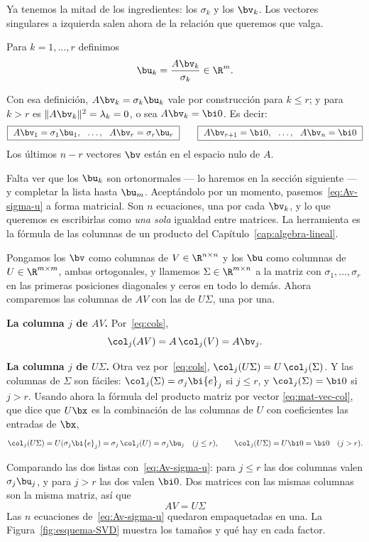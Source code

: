 Ya tenemos la mitad de los ingredientes: los $\sigma_k$ y los $\bv_k$. Los
vectores singulares a izquierda salen ahora de la relación que queremos que
valga.

\begin{definition}\label{def:u}
Para $k=1,\dots,r$ definimos
\[
\bu_k=\frac{A\bv_k}{\sigma_k}\in\R^m .
\]
\end{definition}

Con esa definición, $A\bv_k=\sigma_k\bu_k$ vale por construcción para
$k\le r$; y para $k>r$ es $\|A\bv_k\|^2=\lambda_k=0$, o sea $A\bv_k=\bi 0$.
Es decir:
\begin{equation}\label{eq:Av-sigma-u}
\boxed{\ A\bv_1=\sigma_1\bu_1,\ \ \dots,\ \ A\bv_r=\sigma_r\bu_r\ }
\qquad
\boxed{\ A\bv_{r+1}=\bi 0,\ \ \dots,\ \ A\bv_n=\bi 0\ }
\end{equation}
Los últimos $n-r$ vectores $\bv$ están en el espacio nulo de $A$.

Falta ver que los $\bu_k$ son ortonormales --- lo haremos en la sección
siguiente --- y completar la lista hasta $\bu_m$. Aceptándolo por un momento,
pasemos~\eqref{eq:Av-sigma-u} a forma matricial. Son $n$ ecuaciones, una por
cada $\bv_k$, y lo que queremos es escribirlas como \emph{una sola} igualdad
entre matrices. La herramienta es la fórmula de las columnas de un producto
del Capítulo~\ref{cap:algebra-lineal}.

Pongamos los $\bv$ como columnas de $V\in\R^{n\times n}$ y los $\bu$ como
columnas de $U\in\R^{m\times m}$, ambas ortogonales, y llamemos
$\Sigma\in\R^{m\times n}$ a la matriz con $\sigma_1,\dots,\sigma_r$ en las
primeras posiciones diagonales y ceros en todo lo demás. Ahora comparemos las
columnas de $AV$ con las de $U\Sigma$, una por una.

\medskip
\noindent\textbf{La columna $j$ de $AV$.} Por~\eqref{eq:cols},
\[
\col_j(AV)=A\,\col_j(V)=A\bv_j .
\]

\noindent\textbf{La columna $j$ de $U\Sigma$.} Otra vez por~\eqref{eq:cols},
$\col_j(U\Sigma)=U\,\col_j(\Sigma)$. Y las columnas de $\Sigma$ son fáciles:
$\col_j(\Sigma)=\sigma_j\bi{e}_j$ si $j\le r$, y $\col_j(\Sigma)=\bi 0$ si
$j>r$. Usando ahora la fórmula del producto matriz por vector
\eqref{eq:mat-vec-col}, que dice que $U\bx$ es la combinación de las columnas
de $U$ con coeficientes las entradas de $\bx$,
\[
\col_j(U\Sigma)=U(\sigma_j\bi{e}_j)=\sigma_j\,\col_j(U)=\sigma_j\bu_j
\quad (j\le r),
\qquad
\col_j(U\Sigma)=U\bi 0=\bi 0\quad (j>r).
\]

\medskip
Comparando las dos listas con~\eqref{eq:Av-sigma-u}: para $j\le r$ las dos
columnas valen $\sigma_j\bu_j$, y para $j>r$ las dos valen $\bi 0$. Dos
matrices con las mismas columnas son la misma matriz, así que
\begin{equation}\label{eq:AV-USigma}
\boxed{\ AV=U\Sigma\ }
\end{equation}
Las $n$ ecuaciones de~\eqref{eq:Av-sigma-u} quedaron empaquetadas en una. La
Figura~\ref{fig:esquema-SVD} muestra los tamaños y qué hay en cada factor.

